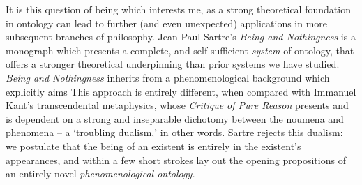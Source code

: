 It is this question of being which interests me, as a strong theoretical foundation in ontology can lead to further (and even unexpected) applications in more subsequent branches of philosophy. Jean-Paul Sartre's \emph{Being and Nothingness} is a monograph which presents a complete, and self-sufficient \emph{system} of ontology, that offers a stronger theoretical underpinning than prior systems we have studied. \emph{Being and Nothingness} inherits from a phenomenological background which explicitly aims  This approach is entirely different, when compared with Immanuel Kant's transcendental metaphysics, whose \emph{Critique of Pure Reason} presents and is dependent on a strong and inseparable dichotomy between the noumena and phenomena -- a \enquote*{troubling dualism,} in other words. Sartre rejects this dualism: we postulate that the being of an existent is entirely in the existent's appearances, and within a few short strokes lay out the opening propositions of an entirely novel \emph{phenomenological ontology.}



